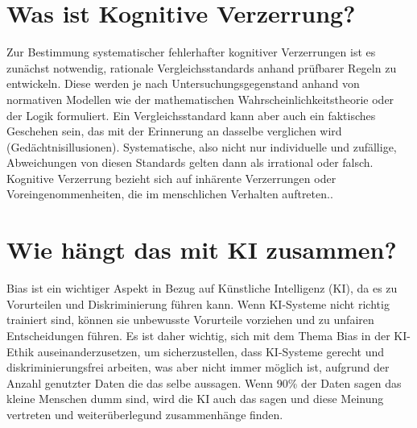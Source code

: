 
\section{Was ist Kognitive Verzerrung?}

Zur Bestimmung systematischer fehlerhafter kognitiver Verzerrungen 
ist es zunächst notwendig, rationale Vergleichsstandards anhand 
prüfbarer Regeln zu entwickeln. Diese werden je nach Untersuchungsgegenstand 
anhand von normativen Modellen wie der mathematischen Wahrscheinlichkeitstheorie 
oder der Logik formuliert. Ein Vergleichsstandard kann aber auch ein 
faktisches Geschehen sein, das mit der Erinnerung an dasselbe verglichen 
wird (Gedächtnisillusionen). Systematische, also nicht nur individuelle 
und zufällige, Abweichungen von diesen Standards gelten dann als irrational 
oder falsch. Kognitive Verzerrung bezieht sich auf inhärente Verzerrungen oder 
Voreingenommenheiten, die im menschlichen Verhalten auftreten.\citep{Kognitive_Verzerrung}.
\newpage
\section{Wie hängt das mit KI zusammen?}
Bias ist ein wichtiger Aspekt in Bezug auf Künstliche Intelligenz (KI), 
da es zu Vorurteilen und Diskriminierung führen kann. Wenn KI-Systeme nicht 
richtig trainiert sind, können sie unbewusste Vorurteile vorziehen und 
zu unfairen Entscheidungen führen. Es ist daher wichtig, sich mit dem Thema 
Bias in der KI-Ethik auseinanderzusetzen, um sicherzustellen, dass KI-Systeme 
gerecht und diskriminierungsfrei arbeiten, was aber nicht immer möglich ist, 
aufgrund der Anzahl genutzter Daten die das selbe aussagen. Wenn 90\% der Daten 
sagen das kleine Menschen dumm sind, wird die KI auch das sagen und diese Meinung 
vertreten und weiterüberlegund zusammenhänge finden. 